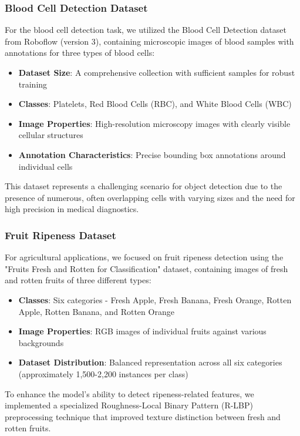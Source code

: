 \begin{multicols}{2}
\subsubsection{Blood Cell Detection Dataset}

For the blood cell detection task, we utilized the Blood Cell Detection dataset from Roboflow (version 3), containing microscopic images of blood samples with annotations for three types of blood cells:

\begin{itemize}
    \item \textbf{Dataset Size}: A comprehensive collection with sufficient samples for robust training
    \item \textbf{Classes}: Platelets, Red Blood Cells (RBC), and White Blood Cells (WBC)
    \item \textbf{Image Properties}: High-resolution microscopy images with clearly visible cellular structures
    \item \textbf{Annotation Characteristics}: Precise bounding box annotations around individual cells
\end{itemize}

This dataset represents a challenging scenario for object detection due to the presence of numerous, often overlapping cells with varying sizes and the need for high precision in medical diagnostics.

\subsubsection{Fruit Ripeness Dataset}

For agricultural applications, we focused on fruit ripeness detection using the "Fruits Fresh and Rotten for Classification" dataset, containing images of fresh and rotten fruits of three different types:

\begin{itemize}
    \item \textbf{Classes}: Six categories - Fresh Apple, Fresh Banana, Fresh Orange, Rotten Apple, Rotten Banana, and Rotten Orange
    \item \textbf{Image Properties}: RGB images of individual fruits against various backgrounds
    \item \textbf{Dataset Distribution}: Balanced representation across all six categories (approximately 1,500-2,200 instances per class)
\end{itemize}

To enhance the model's ability to detect ripeness-related features, we implemented a specialized Roughness-Local Binary Pattern (R-LBP) preprocessing technique that improved texture distinction between fresh and rotten fruits.


\end{multicols}
